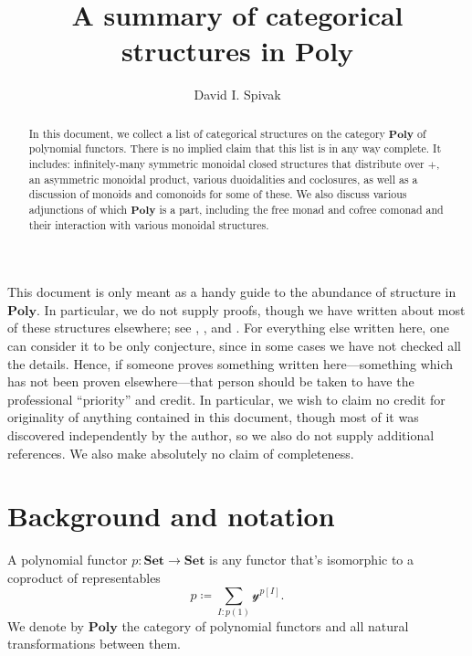 \documentclass[11pt, one side, article]{memoir}
\theoremstyle{definition}
\theoremstyle{plain}
\newcommand{\Cat}[1]{\mathbf{#1}}%
\newcommand{\smset}{\Cat{Set}}
\newcommand{\yon}{{\mathcal{y}}}
\newcommand{\poly}{\Cat{Poly}}
\newcommand{\0}{\textsf{0}}
\newcommand{\1}{\tn{\textsf{1}}}
\begin{document}
\title{A summary of categorical structures in $\poly$}

\author{David I. Spivak}


\maketitle

\begin{abstract}
In this document, we collect a list of categorical structures on the category $\poly$ of polynomial functors. There is no implied claim that this list is in any way complete. It includes: infinitely-many symmetric monoidal closed structures that distribute over $+$, an asymmetric monoidal product, various duoidalities and coclosures, as well as a discussion of monoids and comonoids for some of these. We also discuss various adjunctions of which $\poly$ is a part, including the free monad and cofree comonad and their interaction with various monoidal structures. 
\end{abstract}


\tableofcontents*
\bigskip

This document is only meant as a handy guide to the abundance of structure in $\poly$. In particular, we do not supply proofs, though we have written about most of these structures elsewhere; see \cite{spivak2021functorial}, \cite{niu2025poly}, and \cite{spivak2022polynomial}. For everything else written here, one can consider it to be only conjecture, since in some cases we have not checked all the details. Hence, if someone proves something written here---something which has not been proven elsewhere---that person should be taken to have the professional ``priority'' and credit. In particular, we wish to claim no credit for originality of anything contained in this document, though most of it was discovered independently by the author, so we also do not supply additional references. We also make absolutely no claim of completeness.

\chapter{Background and notation}

A polynomial functor $p\colon\smset\to\smset$ is any functor that's isomorphic to a coproduct of representables
\[
p\coloneqq\sum_{I: p(1)}\yon^{p[I]}.
\]
We denote by $\poly$ the category of polynomial functors and all natural transformations between them.
\end{document}
